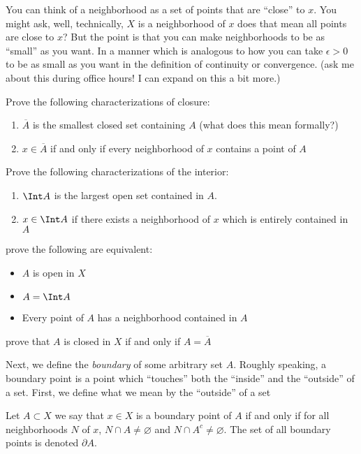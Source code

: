 \documentclass{pset}
\begin{document}
You can think of a neighborhood as a set of points that are ``close'' to $x$. You might ask, well, technically, $X$ is a neighborhood of $x$ does that mean all points are close to $x$? But the point is that you can make neighborhoods to be as ``small'' as you want. In a manner which is  analogous to how you can take $\epsilon>0$ to be as small as you want in the definition of continuity or convergence. (ask me about this during office hours! I can expand on this a bit more.)
\begin{exercise}[\skipforward]
    Prove the following characterizations of closure:
    \begin{enumerate}[label=\roman*.]
        \item $\overline{A}$ is the smallest closed set containing $A$ (what does this mean formally?)
        \item $x\in \overline{A}$ if and only if every neighborhood of $x$ contains a point of $A$
    \end{enumerate}
\end{exercise}
\begin{exercise}[\skipforward]
    Prove the following characterizations of the interior:
    \begin{enumerate}[label=\roman*.]
        \item $\Int A$ is the largest open set contained in $A$.
        \item $x\in \Int A$ if there exists a neighborhood of $x$ which is entirely contained in $A$
    \end{enumerate}
\end{exercise}
\begin{exercise}
    prove the following are equivalent:
    \begin{itemize}
        \item $A$ is open in $X$
        \item $A=\Int A$
        \item Every point of $A$ has a neighborhood contained in $A$
    \end{itemize}
\end{exercise}
\begin{exercise}
    prove that $A$ is closed in $X$ if and only if $A=\overline A$
\end{exercise}
Next, we define the \emph{boundary} of some arbitrary set $A$. Roughly speaking, a boundary point is a point which ``touches'' both the ``inside'' and the ``outside'' of a set. First, we define what we mean by the ``outside'' of a set
\begin{definition}
    Let $A\subset X$ we say that $x\in X$ is a boundary point of $A$ if and only if for all neighborhoods $N$ of $x$, $N\cap A\neq\varnothing$ 
    and $N\cap A^c\neq\varnothing$. The set of all boundary points is denoted $\partial A$.
\end{definition}
\end{document}
